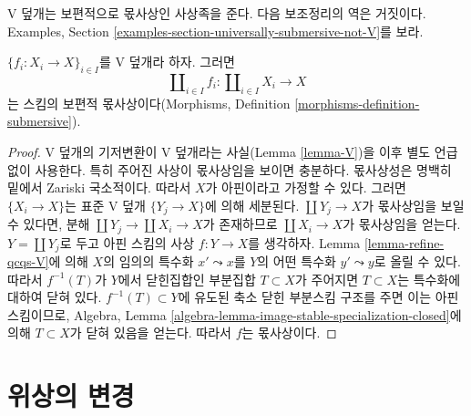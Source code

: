 \noindent
V 덮개는 보편적으로 몫사상인 사상족을 준다. 다음 보조정리의 역은
거짓이다. Examples, Section
\ref{examples-section-universally-submersive-not-V}를 보라.

\begin{lemma}
\label{lemma-V-covering-universally-submersive}
$\{f_i : X_i \to X\}_{i \in I}$를 V 덮개라 하자. 그러면
$$
\coprod\nolimits_{i \in I} f_i :
\coprod\nolimits_{i \in I} X_i
\longrightarrow
X
$$
는 스킴의 보편적 몫사상이다(Morphisms, Definition
\ref{morphisms-definition-submersive}).
\end{lemma}

\begin{proof}
V 덮개의 기저변환이 V 덮개라는 사실(Lemma \ref{lemma-V})을 이후 별도
언급 없이 사용한다. 특히 주어진 사상이 몫사상임을 보이면 충분하다.
몫사상성은 명백히 밑에서 Zariski 국소적이다. 따라서 $X$가 아핀이라고
가정할 수 있다. 그러면 $\{X_i \to X\}$는 표준 V 덮개
$\{Y_j \to X\}$에 의해 세분된다. $\coprod Y_j \to X$가 몫사상임을 보일
수 있다면, 분해 $\coprod Y_j \to \coprod X_i \to X$가 존재하므로
$\coprod X_i \to X$가 몫사상임을 얻는다. $Y = \coprod Y_j$로 두고 아핀
스킴의 사상 $f : Y \to X$를 생각하자. Lemma
\ref{lemma-refine-qcqs-V}에 의해 $X$의 임의의 특수화 $x' \leadsto x$를
$Y$의 어떤 특수화 $y' \leadsto y$로 올릴 수 있다. 따라서
$f^{-1}(T)$가 $Y$에서 닫힌집합인 부분집합 $T \subset X$가 주어지면
$T \subset X$는 특수화에 대하여 닫혀 있다. $f^{-1}(T) \subset Y$에
유도된 축소 닫힌 부분스킴 구조를 주면 이는 아핀 스킴이므로, Algebra,
Lemma \ref{algebra-lemma-image-stable-specialization-closed}에 의해
$T \subset X$가 닫혀 있음을 얻는다. 따라서 $f$는 몫사상이다.
\end{proof}





















\section{위상의 변경}
\label{section-change-topologies}

